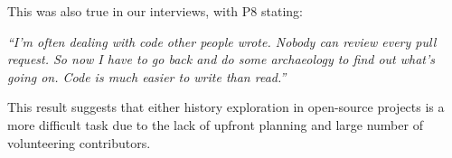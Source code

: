 This was also true in our interviews, with P8 stating:

\begin{quoting}
\textit{``I'm often dealing with code other people wrote. Nobody can review every pull request. So now I have to go back and do some archaeology to find out what's going on. Code is much easier to write than read.''}
\end{quoting}

This result suggests that either history exploration in open-source projects is a more difficult task due to the lack of upfront planning and large number of volunteering contributors.
